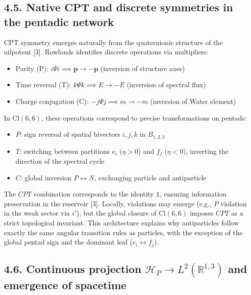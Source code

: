 \documentclass[11pt]{article}
\providecommand{\tightlist}{\setlength{\itemsep}{2pt}\setlength{\parskip}{6pt}}
\let\oldmathcal\mathcal
\renewcommand{\mathcal}[1]{\oldmathcal{#1}}
\providecommand{\tightlist}{%
  \setlength{\itemsep}{2pt}\setlength{\parskip}{6pt}
}
\begin{document}
\hypertarget{native-cpt-and-discrete-symmetries-in-the-pentadic-network}{%
\subsection{4.5. Native CPT and discrete symmetries in the pentadic
network}\label{native-cpt-and-discrete-symmetries-in-the-pentadic-network}}

CPT symmetry emerges naturally from the quaternionic structure of the
nilpotent {[}3{]}. Rowlands identifies discrete operations via
multipliers:

\begin{itemize}
\tightlist
\item
  Parity (P): \(i \Psi i \implies \mathbf{p} \to -\mathbf{p}\)
  (inversion of structure axes)
\item
  Time reversal (T): \(k \Psi k \implies E \to -E\) (inversion of
  spectral flux)
\item
  Charge conjugation (C): \(-j \Psi j \implies m \to -m\) (inversion of
  Water element)
\end{itemize}

In \(\text{Cl}(6,6)\), these operations correspond to precise
transformations on pentads:

\begin{itemize}
\tightlist
\item
  \(P\): sign reversal of spatial bivectors \({i,j,k}\) in \(B_{1,2,3}\)
\item
  \(T\): switching between partitions \(e_i\) (\(\eta>0\)) and \(f_j\)
  (\(\eta<0\)), inverting the direction of the spectral cycle
\item
  \(C\): global inversion \(P \leftrightarrow N\), exchanging particle
  and antiparticle
\end{itemize}

The \(CPT\) combination corresponds to the identity \(\mathbb{1}\),
ensuring information preservation in the reservoir {[}3{]}. Locally,
violations may emerge (e.g., \(P\) violation in the weak sector via
\(i'\)), but the global closure of \(\text{Cl}(6,6)\) imposes \(CPT\) as
a strict topological invariant. This architecture explains why
antiparticles follow exactly the same angular transition rules as
particles, with the exception of the global pentad sign and the dominant
leaf (\(e_i \leftrightarrow f_j\)).

\hypertarget{continuous-projection-mathcalh_p-to-l2mathbbr13-and-emergence-of-spacetime}{%
\subsection{\texorpdfstring{4.6. Continuous projection
\(\mathcal{H}_P \to L^2(\mathbb{R}^{1,3})\) and emergence of
spacetime}{4.6. Continuous projection \textbackslash mathcal\{H\}\_P \textbackslash to L\^{}2(\textbackslash mathbb\{R\}\^{}\{1,3\}) and emergence of spacetime}}\label{continuous-projection-mathcalh_p-to-l2mathbbr13-and-emergence-of-spacetime}}
\end{document}
